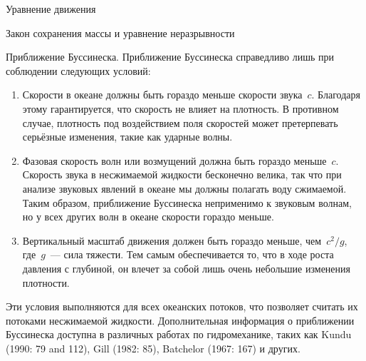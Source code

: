 \begin{chapter}{Уравнение движения}
\begin{section}{Закон сохранения массы и уравнение неразрывности}
\begin{paragraph}{Приближение Буссинеска.}
Приближение Буссинеска справедливо лишь при соблюдении следующих условий:
\begin{enumerate}
\item
Скорости в океане должны быть гораздо меньше скорости звука~$c$. Благодаря 
этому гарантируется, что скорость не влияет на плотность. В противном случае,
плотность под воздействием поля скоростей может претерпевать серьёзные 
изменения, такие как ударные волны.
%

\item
Фазовая скорость волн  или возмущений должна быть гораздо меньше~$c$. 
Скорость звука в несжимаемой жидкости бесконечно велика, так что при 
анализе звуковых явлений в океане мы должны полагать воду сжимаемой. 
Таким образом, приближение Буссинеска неприменимо к звуковым волнам, 
но у всех других волн в океане скорости гораздо меньше.
%

\item
Вертикальный масштаб движения должен быть гораздо меньше, чем~$c^2/g$,
где~$g$~--- сила тяжести. Тем самым обеспечивается то, что в ходе роста
давления с глубиной, он влечет за собой лишь очень небольшие
изменения плотности.
%
\end{enumerate}

Эти условия выполняются для всех океанских потоков, что позволяет считать их 
потоками несжимаемой жидкости.
Дополнительная информация о приближении Буссинеска
доступна в различных работах по гидромеханике, таких как 
Kundu (1990: 79 and 112), Gill (1982: 85), Batchelor (1967: 167) и других.
%
\end{paragraph}


\end{section}
\end{chapter}
